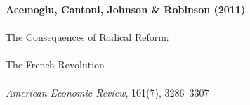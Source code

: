 \documentclass[12pt]{article}
\begin{document}
\begin{center}
{\Large\bfseries Acemoglu, Cantoni, Johnson \& Robinson (2011)}\\\\
{\large The Consequences of Radical Reform:}\\\\
{\large The French Revolution}\\\\
\vspace{0.5em}
{\normalsize \textit{American Economic Review}, 101(7), 3286--3307}
\end{center}

\vspace{1em}




\end{document}

